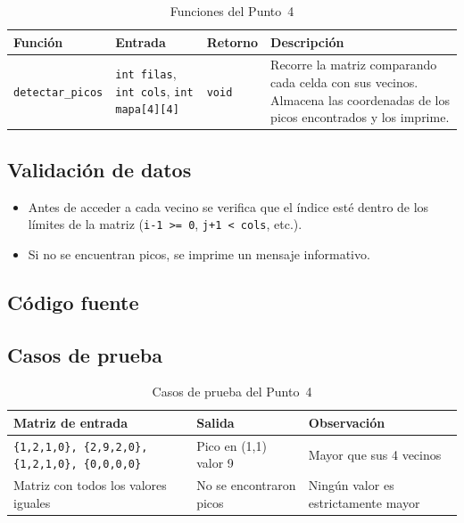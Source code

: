 \documentclass[12pt, letterpaper]{article}
\begin{document}
\begin{table}[H]
\centering
\begin{tabular}{|l|p{4cm}|l|p{5cm}|}
\hline
\textbf{Función} & \textbf{Entrada} & \textbf{Retorno} & \textbf{Descripción} \\
\hline
\texttt{detectar\_picos} &
\texttt{int filas},
\texttt{int cols},
\texttt{int mapa[4][4]} &
\texttt{void} &
Recorre la matriz comparando cada celda con sus vecinos. Almacena las
coordenadas de los picos encontrados y los imprime. \\
\hline
\end{tabular}
\caption{Funciones del Punto~4}
\end{table}

\subsection{Validación de datos}

\begin{itemize}
    \item Antes de acceder a cada vecino se verifica que el índice esté
          dentro de los límites de la matriz (\texttt{i-1 >= 0},
          \texttt{j+1 < cols}, etc.).
    \item Si no se encuentran picos, se imprime un mensaje informativo.
\end{itemize}

\subsection{Código fuente}



\subsection{Casos de prueba}

\begin{table}[H]
\centering
\begin{tabular}{|p{5cm}|p{5cm}|p{3.5cm}|}
\hline
\textbf{Matriz de entrada} & \textbf{Salida} & \textbf{Observación} \\
\hline
\texttt{\{1,2,1,0\}, \{2,9,2,0\},} \texttt{\{1,2,1,0\}, \{0,0,0,0\}} &
Pico en (1,1) valor 9 &
Mayor que sus 4 vecinos \\
\hline
Matriz con todos los valores iguales &
No se encontraron picos &
Ningún valor es estrictamente mayor \\
\hline
\end{tabular}
\caption{Casos de prueba del Punto~4}
\end{table}
\end{document}

